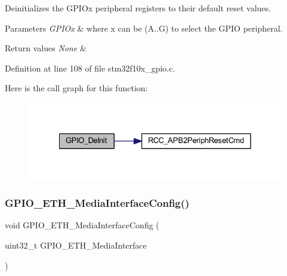 Deinitializes the G\+P\+I\+Ox peripheral registers to their default reset values. 


\begin{DoxyParams}{Parameters}
{\em G\+P\+I\+Ox} & where x can be (A..G) to select the G\+P\+IO peripheral. \\
\hline
\end{DoxyParams}

\begin{DoxyRetVals}{Return values}
{\em None} & \\
\hline
\end{DoxyRetVals}


Definition at line 108 of file stm32f10x\+\_\+gpio.\+c.

Here is the call graph for this function\+:
\nopagebreak
\begin{figure}[H]
\begin{center}
\leavevmode
\includegraphics[width=328pt]{group___g_p_i_o___private___functions_gaa60bdf3182c44b5fa818f237042f52ee_cgraph}
\end{center}
\end{figure}
\mbox{\label{group___g_p_i_o___private___functions_gacbfad958f684347be0f2c762dc85c3c2}} 
\subsubsection{\texorpdfstring{G\+P\+I\+O\+\_\+\+E\+T\+H\+\_\+\+Media\+Interface\+Config()}{GPIO\_ETH\_MediaInterfaceConfig()}}
{\footnotesize\ttfamily void G\+P\+I\+O\+\_\+\+E\+T\+H\+\_\+\+Media\+Interface\+Config (\begin{DoxyParamCaption}\item[{uint32\+\_\+t}]{G\+P\+I\+O\+\_\+\+E\+T\+H\+\_\+\+Media\+Interface }\end{DoxyParamCaption})}



